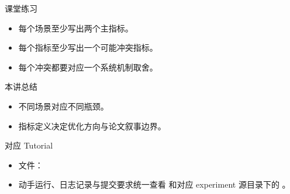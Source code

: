 \begin{frame}{课堂练习}
  \begin{itemize}
    \item 每个场景至少写出两个主指标。
    \item 每个指标至少写出一个可能冲突指标。
    \item 每个冲突都要对应一个系统机制取舍。
  \end{itemize}
\end{frame}

\begin{frame}{本讲总结}
  \begin{itemize}
    \item 不同场景对应不同瓶颈。
    \item 指标定义决定优化方向与论文叙事边界。
  \end{itemize}
\end{frame}

\LectureTwoSources

\begin{frame}{对应 Tutorial}
  \begin{itemize}
    \item 文件：\texttt{}
    \item 动手运行、日志记录与提交要求统一查看 \texttt{} 和对应 experiment 源目录下的 \texttt{}。
  \end{itemize}
\end{frame}


